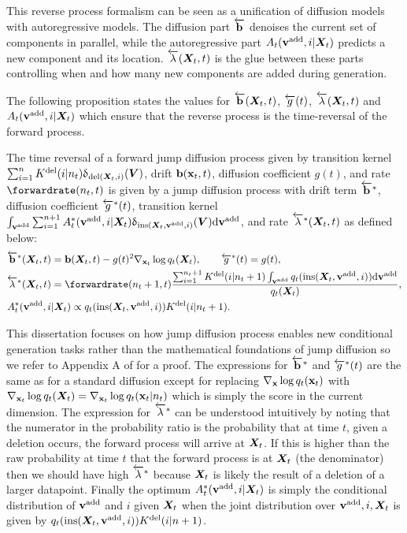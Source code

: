 This reverse process formalism can be seen as a unification of diffusion models with autoregressive models. The diffusion part $\overleftarrow{\mathbf{b}}$ denoises the current set of components in parallel, while the autoregressive part $A_t({\mathbf{v}}^{\textup{add}}, i | {\bm{X}}_t)$ predicts a new component and its location. $\overleftarrow{\lambda}({\bm{X}}_t, t)$ is the glue between these parts controlling when and how many new components are added during generation.

The following proposition states the values for $\overleftarrow{\mathbf{b}}({\bm{X}}_t, t)$, $\overleftarrow{g}(t)$, $\overleftarrow{\lambda}({\bm{X}}_t, t)$ and $A_t({\mathbf{v}}^{\textup{add}}, i | {\bm{X}}_t)$ which ensure that the reverse process is the time-reversal of the forward process.
\begin{proposition}
\label{prop:time_reversal}
The time reversal of a forward jump diffusion process given by transition kernel $\sum_{i=1}^n K^{\textup{del}}(i | n_t) \updelta_{\textup{del}({\bm{X}}_t, i)}({\bm{V}})$, drift ${\mathbf{b}}({\mathbf{x}}_t, t)$, diffusion coefficient $g(t)$, and rate $\forwardrate(n_t, t)$ is given by a jump diffusion process with drift term $\overleftarrow{\mathbf{b}}^*$, diffusion coefficient $\overleftarrow{g}^*(t)$, transition kernel $\int_{{\mathbf{v}}^{\textup{add}}} \sum_{i=1}^{n+1}  A^*_t({\mathbf{v}}^{\textup{add}}, i | {\bm{X}}_t) \updelta_{\textup{ins}({\bm{X}}_t, {\mathbf{v}}^{\textup{add}}, i)}({\bm{V}}) \mathrm{d} {\mathbf{v}}^{\textup{add}}$, and rate $\overleftarrow{\lambda}^*({\bm{X}}_t, t)$ as defined below:
\begin{align}
    &\backwarddrift^*(\mX_t, t) = \rvb(\mX_t, t) - g(t)^2 \nabla_{\rvx_t} \log q_t(\mX_t), \qquad \backwarddiffcoeff^*(t) = g(t),\\
    & \backwardrate^*(\mX_t, t) = \forwardrate(n_t+1, t) \frac{ \sum_{i=1}^{n_t+1} \delidxdist(i | n_t+1) \int_{\yadd} q_t(\textup{ins}(\mX_t, \yadd, i)) \rmd \yadd }{q_t(\mX_t)},\\
    & \autonet_{t}^*( \yadd, i | \mX_t) \propto q_{t}(\textup{ins}(\mX_t, \yadd, i) ) \delidxdist(i| n_t+1).
\end{align}
\end{proposition}
This dissertation focuses on how jump diffusion process enables new conditional generation tasks rather than the mathematical foundations of jump diffusion so we refer to Appendix A of \citet{campbell2024trans} for a proof. The expressions for $\overleftarrow{\mathbf{b}}^*$ and $\overleftarrow{g}^*(t)$ are the same as for a standard diffusion except for replacing $\nabla_{{\mathbf{x}}} \log q_t({\mathbf{x}}_t)$ with $\nabla_{{\mathbf{x}}_t} \log q_t({\bm{X}}_t) = \nabla_{{\mathbf{x}}_t} \log q_t({\mathbf{x}}_t | n_t)$ which is simply the score in the current dimension.
The expression for $\overleftarrow{\lambda}^*$ can be understood intuitively by noting that the numerator in the probability ratio is the probability that at time $t$, given a deletion occurs, the forward process will arrive at ${\bm{X}}_t$. If this is higher than the raw probability at time $t$ that the forward process is at ${\bm{X}}_t$ (the denominator) then we should have high $\overleftarrow{\lambda}^*$ because ${\bm{X}}_t$ is likely the result of a deletion of a larger datapoint.
Finally the optimum $A^*_t({\mathbf{v}}^{\textup{add}}, i | {\bm{X}}_t)$ is simply the conditional distribution of ${\mathbf{v}}^{\textup{add}}$ and $i$ given ${\bm{X}}_t$ when the joint distribution over ${\mathbf{v}}^{\textup{add}}, i, {\bm{X}}_t$ is given by $q_{t}(\text{ins}({\bm{X}}_t, {\mathbf{v}}^{\textup{add}}, i) ) K^{\textup{del}}(i| n+1)$. 

